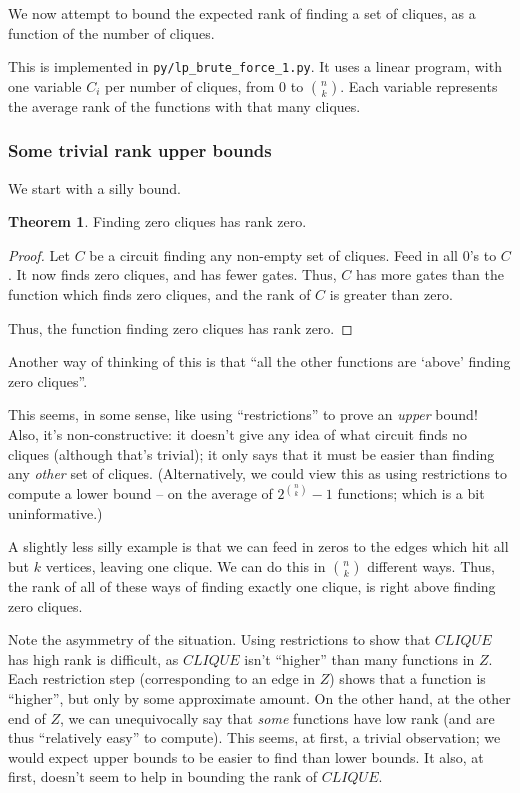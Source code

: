 \documentclass[12pt]{article}
\theoremstyle{definition}
\newtheorem{thm}{Theorem}[section]
\begin{document}
We now attempt to bound the expected rank of finding a set
of cliques, as a function of the number of cliques.

This is implemented in
{\tt py/lp\_brute\_force\_1.py}. It uses a linear program, with
one variable $C_i$ per number of cliques, from 0 to ${n \choose k}$.
Each variable represents the average rank of the functions with
that many cliques.

\subsubsection{Some trivial rank upper bounds}

We start with a silly bound.

\begin{thm}
\label{zeroCliques}
Finding zero cliques has rank zero.
\end{thm}
\begin{proof}

Let $C$ be a circuit finding any non-empty set of cliques.
Feed in all 0's to $C$. It now finds zero cliques, and has
fewer gates. Thus, $C$ has more gates than the function
which finds zero cliques, and the rank of $C$ is greater
than zero.

Thus, the function finding zero cliques has rank zero.

\end{proof}
 
Another way of thinking of this is that ``all the other functions
are `above' finding zero cliques''.

This seems, in some sense, like using ``restrictions'' to prove an {\em upper} bound!
Also, it's non-constructive: it doesn't give any idea of what circuit finds no cliques
(although that's trivial); it only says that it must be easier than finding any
{\em other} set of cliques. (Alternatively, we could view this as using restrictions
to compute a lower bound -- on the average of $2^{n \choose k} - 1$ functions; which
is a bit uninformative.)

A slightly less silly example is that we can feed in zeros to 
the edges which hit all but $k$ vertices, leaving one clique.
We can do this in ${n \choose k}$ different ways. Thus, the rank
of all of these ways of finding exactly one clique, is right above
finding zero cliques.

Note the asymmetry of the situation. Using restrictions to show that
$CLIQUE$ has high rank is difficult, as $CLIQUE$ isn't ``higher'' than
many functions in $Z$. Each restriction step (corresponding to an edge in $Z$)
shows that a function is
``higher'', but only by some approximate amount.
On the other hand, at the other end of $Z$, we can unequivocally say
that {\em some} functions have low rank (and are thus
``relatively easy'' to compute).
This seems, at first, a trivial observation; we would expect upper bounds
to be easier to find than lower bounds. It also, at first, doesn't seem
to help in bounding the rank of $CLIQUE$.
\end{document}
